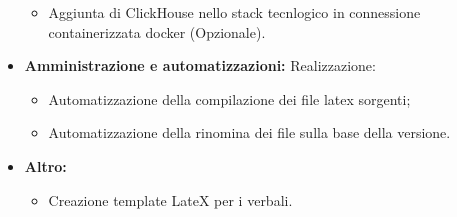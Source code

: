 \documentclass{article}
\begin{document}
\begin{itemize}
\begin{itemize}
        \item Aggiunta di ClickHouse nello stack tecnlogico in connessione containerizzata docker (Opzionale).
    \end{itemize}
    \item  \textbf{Amministrazione e automatizzazioni:} Realizzazione:
    \begin{itemize}
        \item Automatizzazione della compilazione dei file latex sorgenti;
        \item Automatizzazione della rinomina dei file sulla base della versione.
    \end{itemize}
    \item  \textbf{Altro:} 
    \begin{itemize}
        \item Creazione template LateX per i verbali.
    \end{itemize}


\end{itemize}
\end{document}
